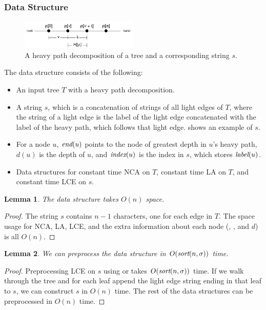 \documentclass[a4]{article}
\newcommand*{\pref}{\prettyref}
\newtheorem{lemma}{Lemma}
\begin{document}
\subsubsection{Data Structure}

\begin{figure}[tp]
    \begin{center}
        \includegraphics[width=0.5\textwidth,page=4]{tree-fingerprint.pdf}
    \end{center}
    \caption{\label{fig:tree-heavy-ds}A heavy path decomposition of a tree and a corresponding  string $s$.}
\end{figure}

The  data structure consists of the following:
\begin{itemize}
\item An input tree $T$ with a heavy path decomposition.
\item A string $s$, which is a concatenation of strings of all light edges of $T$, where the string of a light edge is the label of the light edge concatenated with the label of the heavy path, which follows that light edge. \pref{fig:tree-heavy-ds} shows an example of $s$.
\item For a node $u$, $\textit{end}(u)$ points to the node of greatest depth in $u$'s heavy path, $d(u)$ is the depth of $u$, and $\textit{index}(u)$ is the index in $s$, which stores $\textit{label}(u)$.
\item Data structures for constant time NCA on $T$, constant time LA on $T$, and constant time LCE on $s$.
\end{itemize}

\begin{lemma}
The  data structure takes $O(n)$ space.
\end{lemma}
\begin{proof}
The string $s$ contains $n-1$ characters, one for each edge in $T$. The space usage for NCA, LA, LCE, and the extra information about each node (\zend, \zindex, and $d$) is all $O(n)$.
\end{proof}

\begin{lemma}
We can preprocess the  data structure in $O(\textit{sort}(n,\sigma))$ time.
\end{lemma}
\begin{proof}
Preprocessing LCE on $s$ using  or  takes $O(\textit{sort}(n,\sigma))$ time. If we walk through the tree and for each leaf append the light edge string ending in that leaf to $s$, we can construct $s$ in $O(n)$ time. The rest of the data structures can be preprocessed in $O(n)$ time.
\end{proof}
\end{document}
